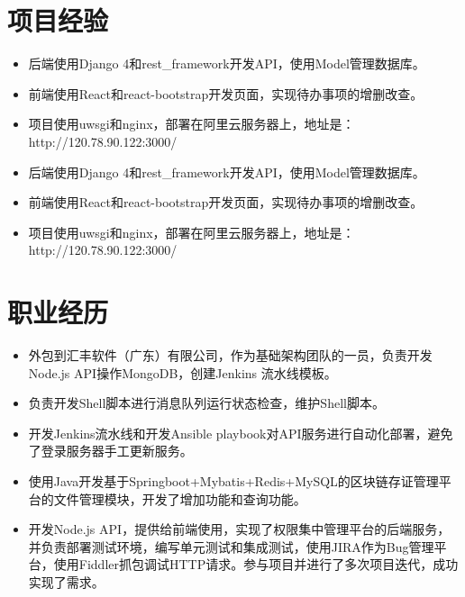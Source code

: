 \documentclass{resume}
\begin{document}
\section{项目经验}
\begin{itemize}[parsep=0.5ex]
  \item 后端使用Django 4和rest\_framework开发API，使用Model管理数据库。
  \item 前端使用React和react-bootstrap开发页面，实现待办事项的增删改查。
  \item 项目使用uwsgi和nginx，部署在阿里云服务器上，地址是：http://120.78.90.122:3000/
\end{itemize}
\begin{itemize}[parsep=0.5ex]
  \item 后端使用Django 4和rest\_framework开发API，使用Model管理数据库。
  \item 前端使用React和react-bootstrap开发页面，实现待办事项的增删改查。
  \item 项目使用uwsgi和nginx，部署在阿里云服务器上，地址是：http://120.78.90.122:3000/
\end{itemize}

\section{职业经历}

\begin{itemize}[parsep=0.5ex]
  \item 外包到汇丰软件（广东）有限公司，作为基础架构团队的一员，负责开发Node.js API操作MongoDB，创建Jenkins 流水线模板。
  \item 负责开发Shell脚本进行消息队列运行状态检查，维护Shell脚本。
  \item 开发Jenkins流水线和开发Ansible playbook对API服务进行自动化部署，避免了登录服务器手工更新服务。
\end{itemize}

\begin{itemize}[parsep=0.5ex]
  \item 使用Java开发基于Springboot+Mybatis+Redis+MySQL的区块链存证管理平台的文件管理模块，开发了增加功能和查询功能。
  \item 开发Node.js API，提供给前端使用，实现了权限集中管理平台的后端服务，并负责部署测试环境，编写单元测试和集成测试，使用JIRA作为Bug管理平台，使用Fiddler抓包调试HTTP请求。参与项目并进行了多次项目迭代，成功实现了需求。
\end{itemize}
\end{document}
